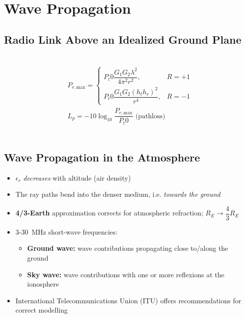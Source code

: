 \section{Wave Propagation}
\subsection{Radio Link Above an Idealized Ground Plane}
\\
\begin{align*}
    &P_{r,\mathrm{max}} =
    \begin{cases}
        P_t0\dfrac{G_1 G_2 \lambda^2}{4\pi^2r^2}, &R=+1\\
        P_t0\dfrac{G_1 G_2 (h_t h_r)^2}{r^4}, &R=-1
    \end{cases}\\
    &L_p = -10 \log_{10}\dfrac{P_{r,\mathrm{max}}}{P_t0}\text{ (pathloss)}
\end{align*}
\\
\subsection{Wave Propagation in the Atmosphere}
\begin{itemize}
    \itemsep0pt
    \item $\epsilon_r$ \textit{decreases} with altitude (air density)
    \item The ray paths bend into the denser medium, i.e. \textit{towards the ground}
    \item \textbf{4/3-Earth} approximation corrects for atmospheric refraction; $R_E \to \dfrac{4}{3}R_E$
    \item 3-\SI{30}{MHz} short-wave frequencies:
        \begin{itemize}
            \itemsep0pt
            \item \textbf{Ground wave:} wave contributions propagating close to/along the ground
            \item \textbf{Sky wave:} wave contributions with one or more reflexions at the ionosphere
        \end{itemize}
    \item International Telecommunications Union (ITU) offers recommendations for correct modelling
\end{itemize}
